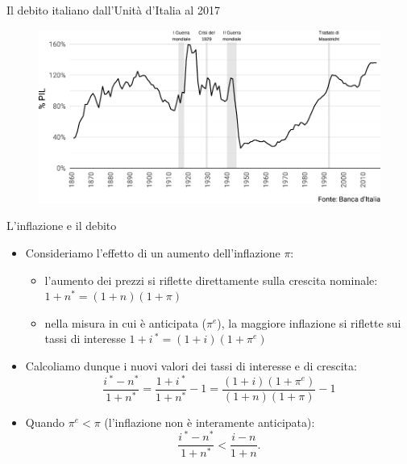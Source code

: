\documentclass[aspectratio=64,11pt]{beamer}
\begin{document}
\begin{frame}{Il debito italiano dall'Unità d'Italia al 2017}

  \begin{figure}
    \centering
    \includegraphics[width=\textwidth]{./figure/debito-PIL-1861-2017.pdf}
  \end{figure}
\end{frame}


\begin{frame}{L'inflazione e il debito}
  
  \begin{itemize}
  \item Consideriamo l'effetto di un aumento dell'inflazione $\pi$:
    \begin{itemize}
    \item l'aumento dei prezzi si riflette direttamente sulla
      crescita nominale:  $1+n^*=(1+n)(1+\pi)$
    \item nella misura in cui è anticipata ($\pi^e$), la maggiore inflazione si riflette sui
      tassi di interesse $1+i\,^*=(1+i)(1+\pi^e)$
    \end{itemize}
  \item Calcoliamo dunque i nuovi valori dei tassi di interesse e di crescita:
    \begin{equation*}
      \frac{i\,^*-n^*}{1+n^*} = \frac{1+i\,^*}{1+n^*}-1 = \frac{(1+i)(1+\pi^e)}{(1+n)(1+\pi)}-1
    \end{equation*}
  \item Quando $\pi^e<\pi$ (l'inflazione non è interamente anticipata):
    \begin{equation*}
      \frac{i\,^*-n^*}{1+n^*} < \frac{i-n}{1+n}.
    \end{equation*}
  \end{itemize}
\end{frame}
\end{document}
